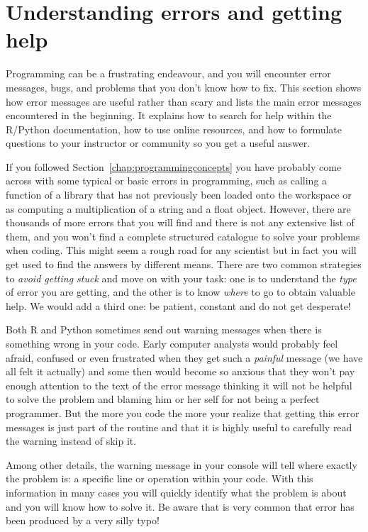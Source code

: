 \section{Understanding errors and getting help}
\label{sec:errors}


Programming can be a frustrating endeavour, and you will encounter error messages, bugs, and problems that you don’t know how to fix. This section shows how error messages are useful rather than scary and lists the main error messages encountered in the beginning. It explains how to search for help within the R/Python documentation, how to use online resources, and how to formulate questions to your instructor or community so you get a useful answer. 

If you followed Section~\ref{chap:programmingconcepts} you have probably come across with some typical or basic errors in programming, such as calling a function of a library that has not previously been loaded onto the workspace or as computing a multiplication of a string and a float object. However, there are thousands of more errors that you will find and there is not any extensive list of them, and you won't find a complete structured catalogue to solve your problems when coding. This might seem a rough road for any scientist but in fact you will get used to find the answers by different means. There are two common strategies to \textit{avoid getting stuck} and move on with your task: one is to understand the \textit{type} of error you are getting, and the other is to know \textit{where} to go to obtain valuable help. We would add a third one: be patient, constant and do not get desperate!

Both R and Python sometimes send out warning messages when there is something wrong in your code. Early computer analysts would probably feel afraid, confused or even frustrated when they get such a \textit{painful} message (we have all felt it actually) and some then would become so anxious that they won't pay enough attention to the text of the error message thinking it will not be helpful to solve the problem and blaming him or her self for not being a perfect programmer. But the more you code the more your realize that getting this error messages is just part of the routine and that it is highly useful to carefully read the warning instead of skip it.

Among other details, the warning message in your console will tell where exactly the problem is: a specific line or operation within your code. With this information in many cases you will quickly identify what the problem is about and you will know how to solve it. Be aware that is very common that error has been produced by a very silly typo!

